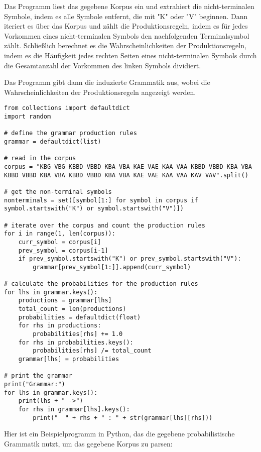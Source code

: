\documentclass[12pt]{article}
\begin{document}
Das Programm liest das gegebene Korpus ein und extrahiert die nicht-terminalen Symbole, indem es alle Symbole entfernt, die mit "K" oder "V" beginnen. Dann iteriert es über das Korpus und zählt die Produktionsregeln, indem es für jedes Vorkommen eines nicht-terminalen Symbols den nachfolgenden Terminalsymbol zählt. Schließlich berechnet es die Wahrscheinlichkeiten der Produktionsregeln, indem es die Häufigkeit jedes rechten Seiten eines nicht-terminalen Symbols durch die Gesamtanzahl der Vorkommen des linken Symbols dividiert.

Das Programm gibt dann die induzierte Grammatik aus, wobei die Wahrscheinlichkeiten der Produktionsregeln angezeigt werden.

\begin{verbatim}
from collections import defaultdict
import random

# define the grammar production rules
grammar = defaultdict(list)

# read in the corpus
corpus = "KBG VBG KBBD VBBD KBA VBA KAE VAE KAA VAA KBBD VBBD KBA VBA KBBD VBBD KBA VBA KBBD VBBD KBA VBA KAE VAE KAA VAA KAV VAV".split()

# get the non-terminal symbols
nonterminals = set([symbol[1:] for symbol in corpus if symbol.startswith("K") or symbol.startswith("V")])

# iterate over the corpus and count the production rules
for i in range(1, len(corpus)):
    curr_symbol = corpus[i]
    prev_symbol = corpus[i-1]
    if prev_symbol.startswith("K") or prev_symbol.startswith("V"):
        grammar[prev_symbol[1:]].append(curr_symbol)

# calculate the probabilities for the production rules
for lhs in grammar.keys():
    productions = grammar[lhs]
    total_count = len(productions)
    probabilities = defaultdict(float)
    for rhs in productions:
        probabilities[rhs] += 1.0
    for rhs in probabilities.keys():
        probabilities[rhs] /= total_count
    grammar[lhs] = probabilities

# print the grammar
print("Grammar:")
for lhs in grammar.keys():
    print(lhs + " ->")
    for rhs in grammar[lhs].keys():
        print("  " + rhs + " : " + str(grammar[lhs][rhs]))

\end{verbatim}

Hier ist ein Beispielprogramm in Python, das die gegebene probabilistische Grammatik nutzt, um das gegebene Korpus zu parsen:
\end{document}
